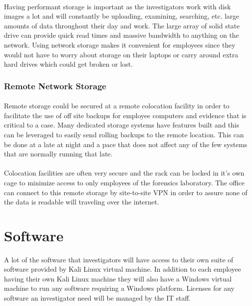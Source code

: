 \documentclass[12pt]{article}
\begin{document}
\paragraph{}
Having performant storage is important as the investigators work with disk images a lot and will constantly be uploading, examining, searching, etc.  large amounts of data throughout their day and work.
The large array of solid state drive can provide quick read times and massive bandwidth to anything on the network.
Using network storage makes it convenient for employees since they would not have to worry about storage on their laptops or carry around extra hard drives which could get broken or lost.


\subsubsection{Remote Network Storage}
\paragraph{}
Remote storage could be secured at a remote colocation facility in order to facilitate the use of off site backups for employee computers and evidence that is critical to a case. 
Many dedicated storage systems have features built and this can be leveraged to easily send rolling backups to the remote location. 
This can be done at a late at night and a pace that does not affect any of the few systems that are normally running that late. 
\paragraph{}
Colocation facilities are often very secure and the rack can be locked in it's own cage to minimize access to only employees of the forensics laboratory. 
The office can connect to this remote storage by site-to-site VPN in order to assure none of the data is readable will traveling over the internet. 

\section{Software}
\paragraph{}
A lot of the software that investigators will have access to their own suite of software provided by Kali Linux virtual machine. In addition to each employee having their own Kali Linux machine they will also have a Windows virtual machine to run any software requiring a Windows platform. Licenses for any software an investigator need will be managed by the IT staff. 
\end{document}
